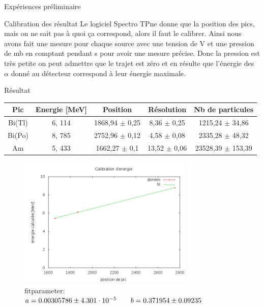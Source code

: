\documentclass[a4paper,11pt]{scrartcl}
\begin{document}
\begin{section}{Expériences préliminaire}
  \begin{subsection}{Calibration des résultat}
   Le logiciel \flqq Spectro TP\frqq ne donne que la position des pics, mais on ne sait pas à quoi \c ca correspond, alors il faut le calibrer. Ainsi nous avons fait une mesure pour chaque source avec une tension de \unit[80]{V} et une pression de \unit[0,78]{mb} en comptant pendant \unit[300]{s} pour avoir une mesure précise. Donc la pression est très petite on peut admettre que le trajet est zéro et en résulte que l'énergie des $\alpha$ donné au détecteur correspond à leur énergie maximale.
   \begin{paragraph}{Résultat}
    \begin{center}
     \begin{tabular}{c|c|c|c|c}
      Pic	& Energie [MeV] &	Position	&	Résolution	&	Nb de particules	\\ \hline
      Bi(Tl)	&6, 114	 &1868,94 $\pm$ 0,25 	&8,36 $\pm$ 0,25	&1215,24 $\pm$ 34,86	\\
      Bi(Po)	&8, 785	&2752,96 $\pm$ 0,12	&4,58 $\pm$ 0,08	&2335,28 $\pm$ 48,32	\\ 
      Am	&5, 433 &1662,27 $\pm$ 0,1	&13,52 $\pm$ 0,06	&23528,39 $\pm$ 153,39	\\ 
     \end{tabular}
    \end{center}
    \begin{figure}[H]
     \begin{center}
      \includegraphics[width=0.75\textwidth]{Bilder/calibration.png}
      \caption[calibration d'énergie]{fitparameter: $ a = 0.00305786  \pm 4.301\cdot 10^{-5} \hspace{2 em} b = 0.371954  \pm 0.09235$ }
     \end{center}
    \end{figure}
   \end{paragraph}

\end{subsection}
\end{section}
\end{document}
